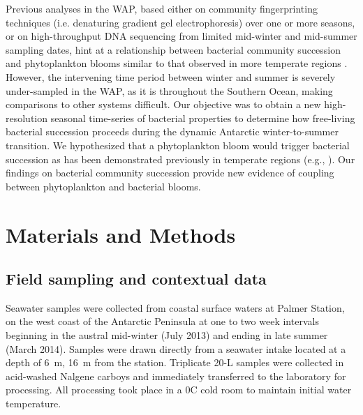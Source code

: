 Previous analyses in the WAP, based either on community fingerprinting techniques (i.e. denaturing gradient gel electrophoresis) over one or more seasons, or on high-throughput DNA sequencing from limited mid-winter and mid-summer sampling dates, hint at a relationship between bacterial community succession and phytoplankton blooms similar to that observed in more temperate regions \citep{mpmtbwd98,mg07,grwddecm12, Luria2014-dj}. However, the intervening time period between winter and summer is severely under-sampled in the WAP, as it is throughout the Southern Ocean, making comparisons to other systems difficult. Our objective was to obtain a new high-resolution seasonal time-series of bacterial properties to determine how free-living bacterial succession proceeds during the dynamic Antarctic winter-to-summer transition. We hypothesized that a phytoplankton bloom would trigger bacterial succession as has been demonstrated previously in temperate regions (e.g., \citealt{Teeling2012-jz}). Our findings on bacterial community succession provide new evidence of coupling between phytoplankton and bacterial blooms.



\section{Materials and Methods}\label{materials-and-methods2} 

\subsection{Field sampling and contextual data}\label{field-sampling-and-contextual-data} 
Seawater samples were collected from coastal surface waters at Palmer Station, on the west coast of the Antarctic Peninsula at one to two week intervals beginning in the austral mid-winter (July 2013) and ending in late summer (March 2014). Samples were drawn directly from a seawater intake located at a depth of \SI{6}{\m}, \SI{16}{\m} from the station. Triplicate 20-L samples were collected in acid-washed Nalgene carboys and immediately transferred to the laboratory for processing. All processing took place in a 0\textdegree C cold room to maintain initial water temperature.

